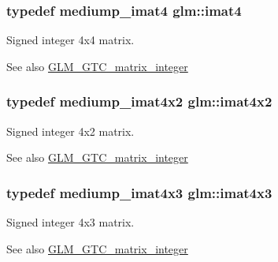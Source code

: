 \subsubsection[{\texorpdfstring{imat4}{imat4}}]{\setlength{\rightskip}{0pt plus 5cm}typedef mediump\+\_\+imat4 {\bf glm\+::imat4}}\hypertarget{group__gtc__matrix__integer_ga40fc5c5e0b07543497aa1c314891544a}{}\label{group__gtc__matrix__integer_ga40fc5c5e0b07543497aa1c314891544a}
Signed integer 4x4 matrix. \begin{DoxySeeAlso}{See also}
\hyperlink{group__gtc__matrix__integer}{G\+L\+M\+\_\+\+G\+T\+C\+\_\+matrix\+\_\+integer} 
\end{DoxySeeAlso}
\subsubsection[{\texorpdfstring{imat4x2}{imat4x2}}]{\setlength{\rightskip}{0pt plus 5cm}typedef mediump\+\_\+imat4x2 {\bf glm\+::imat4x2}}\hypertarget{group__gtc__matrix__integer_ga7e733984837e0e7aa9f4aac18f632f63}{}\label{group__gtc__matrix__integer_ga7e733984837e0e7aa9f4aac18f632f63}
Signed integer 4x2 matrix. \begin{DoxySeeAlso}{See also}
\hyperlink{group__gtc__matrix__integer}{G\+L\+M\+\_\+\+G\+T\+C\+\_\+matrix\+\_\+integer} 
\end{DoxySeeAlso}
\subsubsection[{\texorpdfstring{imat4x3}{imat4x3}}]{\setlength{\rightskip}{0pt plus 5cm}typedef mediump\+\_\+imat4x3 {\bf glm\+::imat4x3}}\hypertarget{group__gtc__matrix__integer_gaa4cca8e80c0603239eda452860063844}{}\label{group__gtc__matrix__integer_gaa4cca8e80c0603239eda452860063844}
Signed integer 4x3 matrix. \begin{DoxySeeAlso}{See also}
\hyperlink{group__gtc__matrix__integer}{G\+L\+M\+\_\+\+G\+T\+C\+\_\+matrix\+\_\+integer} 
\end{DoxySeeAlso}
